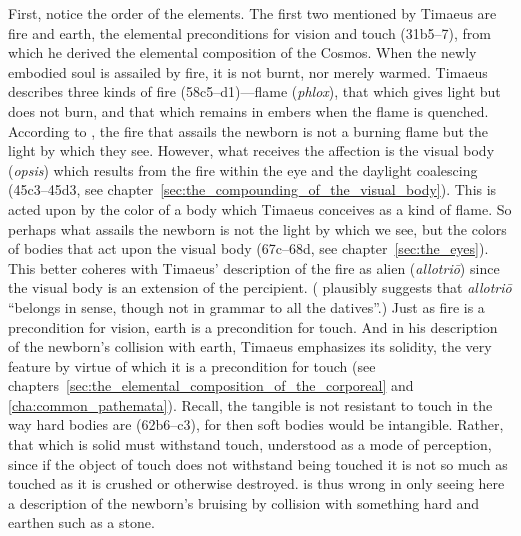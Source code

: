 First, notice the order of the elements. The first two mentioned by Timaeus are fire and earth, the elemental preconditions for vision and touch (31b5--7), from which he derived the elemental composition of the Cosmos. When the newly embodied soul is assailed by fire, it is not burnt, nor merely warmed. Timaeus describes three kinds of fire (58c5–d1)---flame (\emph{phlox}), that which gives light but does not burn, and that which remains in embers when the flame is quenched. According to \cite[149 n10]{Archer-Hind:1888qd}, the fire that assails the newborn is not a burning flame but the light by which they see. However, what receives the affection is the visual body (\emph{opsis}) which results from the fire within the eye and the daylight coalescing (45c3–45d3, see chapter~\ref{sec:the_compounding_of_the_visual_body}). This is acted upon by the color of a body which Timaeus conceives as a kind of flame. So perhaps what assails the newborn is not the light by which we see, but the colors of bodies that act upon the visual body (67c–68d, see chapter~\ref{sec:the_eyes}). This better coheres with Timaeus' description of the fire as alien (\emph{allotriō}) since the visual body is an extension of the percipient. (\citealt[269]{Taylor:1928qb} plausibly suggests that \emph{allotriō} ``belongs in sense, though not in grammar to all the datives''.) Just as fire is a precondition for vision, earth is a precondition for touch. And in his description of the newborn's collision with earth, Timaeus emphasizes its solidity, the very feature by virtue of which it is a precondition for touch (see chapters~\ref{sec:the_elemental_composition_of_the_corporeal} and \ref{cha:common_pathemata}). Recall, the tangible is not resistant to touch in the way hard bodies are (62b6–c3), for then soft bodies would be intangible. Rather, that which is solid must withstand touch, understood as a mode of perception, since if the object of touch does not withstand being touched it is not so much as touched as it is crushed or otherwise destroyed. \citet[269]{Taylor:1928qb} is thus wrong in only seeing here a description of the newborn's bruising by collision with something hard and earthen such as a stone.

